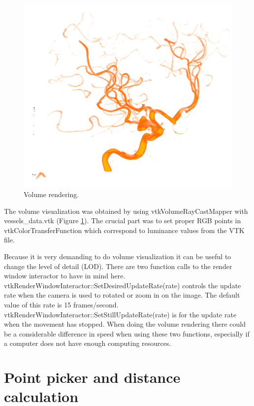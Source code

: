 \begin{figure}
	\centering
	\includegraphics[scale=0.4]{fig/volume-rendering}
	\caption{Volume rendering.}\label{fig:volume-rendering}
\end{figure}

The volume visualization was obtained by using vtkVolumeRayCastMapper with vessels\_data.vtk (Figure \ref{fig:volume-rendering}). The crucial part was to set proper RGB points in vtkColorTransferFunction which correspond to luminance values from the VTK file.

Because it is very demanding to do volume visualization it can be useful to change the level of detail (LOD). There are two function calls to the render window interactor to have in mind here. vtkRenderWindowInteractor::SetDesiredUpdateRate(rate) controls the update rate when the camera is used to rotated or zoom in on the image. The default value of this rate is 15 frames/second. vtkRenderWindowInteractor::SetStillUpdateRate(rate) is for the update rate when the movement has stopped. When doing the volume rendering there could be a considerable difference in speed when using these two functions, especially if a computer does not have enough computing resources.

\section{Point picker and distance calculation}

